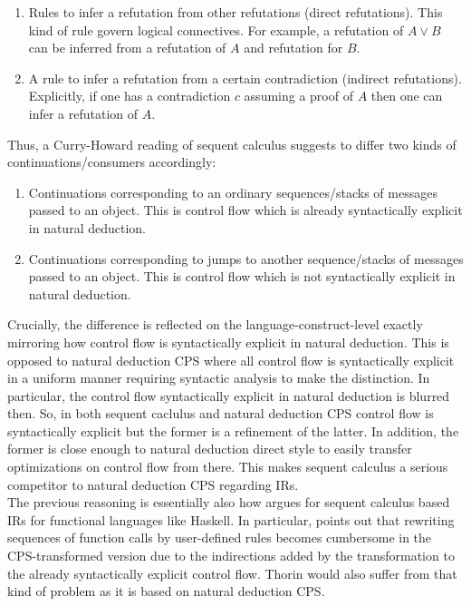 \begin{enumerate}
  \item
    Rules to infer a refutation from other refutations (direct refutations).
    This kind of rule govern logical connectives.
    For example, a refutation of $A \lor B$ can be inferred from a refutation of $A$ and refutation for $B$.
  \item
    A rule to infer a refutation from a certain contradiction (indirect refutations).
    Explicitly, if one has a contradiction $c$ assuming a proof of $A$ then one can infer a refutation of $A$.
\end{enumerate}
Thus, a Curry-Howard reading of sequent calculus suggests to differ two kinds of continuations/consumers accordingly:
\begin{enumerate}
  \item
    Continuations corresponding to an ordinary sequences/stacks of messages passed to an object. This is control flow which is already syntactically explicit in natural deduction.
  \item
    Continuations corresponding to jumps to another sequence/stacks of messages passed to an object. This is control flow which is not syntactically explicit in natural deduction.
\end{enumerate}
Crucially, the difference is reflected on the language-construct-level exactly mirroring how control flow is syntactically explicit in natural deduction.
This is opposed to natural deduction CPS where all control flow is syntactically explicit in a uniform manner requiring syntactic analysis to make the distinction.
In particular, the control flow syntactically explicit in natural deduction is blurred then.
So, in both sequent caclulus and natural deduction CPS control flow is syntactically explicit but the former is a refinement of the latter.
In addition, the former is close enough to natural deduction direct style to easily transfer optimizations on control flow from there.
This makes sequent calculus a serious competitor to natural deduction CPS regarding IRs.
\\
The previous reasoning is essentially also how \cite{seqcore} argues for sequent calculus based IRs for functional languages like Haskell.
In particular, \cite{seqcore} points out that rewriting sequences of function calls by user-defined rules becomes cumbersome in the CPS-transformed version due to the indirections added by the transformation to the already syntactically explicit control flow.
Thorin would also suffer from that kind of problem as it is based on natural deduction CPS.
